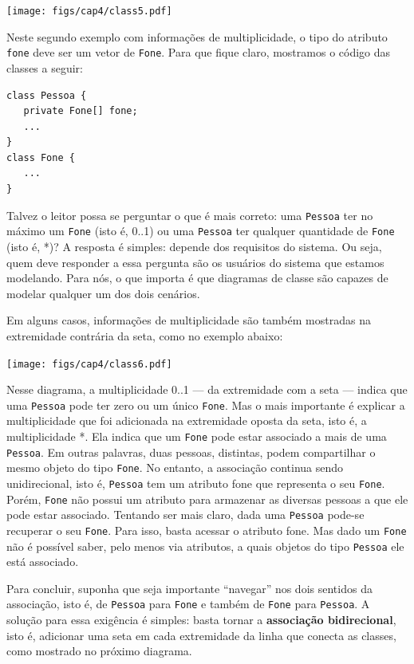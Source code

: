 \documentclass[
  11pt,
  twoside]{book}
\newcommand{\passthrough}[1]{#1}
\begin{document}
\texttt{[image: figs/cap4/class5.pdf]}

Neste segundo exemplo com informações de multiplicidade, o tipo do
atributo \passthrough{\lstinline!fone!} deve ser um vetor de
\passthrough{\lstinline!Fone!}. Para que fique claro, mostramos o código
das classes a seguir:

\begin{lstlisting}
class Pessoa {
   private Fone[] fone;
   ...
}
class Fone {
   ...
}
\end{lstlisting}

Talvez o leitor possa se perguntar o que é mais correto: uma
\passthrough{\lstinline!Pessoa!} ter no máximo um
\passthrough{\lstinline!Fone!} (isto é, 0..1) ou uma
\passthrough{\lstinline!Pessoa!} ter qualquer quantidade de
\passthrough{\lstinline!Fone!} (isto é, *)? A resposta é simples:
depende dos requisitos do sistema. Ou seja, quem deve responder a essa
pergunta são os usuários do sistema que estamos modelando. Para nós, o
que importa é que diagramas de classe são capazes de modelar qualquer um
dos dois cenários.

Em alguns casos, informações de multiplicidade são também mostradas na
extremidade contrária da seta, como no exemplo abaixo:

\texttt{[image: figs/cap4/class6.pdf]}

Nesse diagrama, a multiplicidade 0..1 --- da extremidade com a seta ---
indica que uma \passthrough{\lstinline!Pessoa!} pode ter zero ou um
único \passthrough{\lstinline!Fone!}. Mas o mais importante é explicar a
multiplicidade que foi adicionada na extremidade oposta da seta, isto é,
a multiplicidade *. Ela indica que um \passthrough{\lstinline!Fone!}
pode estar associado a mais de uma \passthrough{\lstinline!Pessoa!}. Em
outras palavras, duas pessoas, distintas, podem compartilhar o mesmo
objeto do tipo \passthrough{\lstinline!Fone!}. No entanto, a associação
continua sendo unidirecional, isto é, \passthrough{\lstinline!Pessoa!}
tem um atributo fone que representa o seu
\passthrough{\lstinline!Fone!}. Porém, \passthrough{\lstinline!Fone!}
não possui um atributo para armazenar as diversas pessoas a que ele pode
estar associado. Tentando ser mais claro, dada uma
\passthrough{\lstinline!Pessoa!} pode-se recuperar o seu
\passthrough{\lstinline!Fone!}. Para isso, basta acessar o atributo
fone. Mas dado um \passthrough{\lstinline!Fone!} não é possível saber,
pelo menos via atributos, a quais objetos do tipo
\passthrough{\lstinline!Pessoa!} ele está associado.

Para concluir, suponha que seja importante ``navegar'' nos dois sentidos
da associação, isto é, de \passthrough{\lstinline!Pessoa!} para
\passthrough{\lstinline!Fone!} e também de
\passthrough{\lstinline!Fone!} para \passthrough{\lstinline!Pessoa!}. A
solução para essa exigência é simples: basta tornar a \textbf{associação
bidirecional}, isto é, adicionar uma seta em cada extremidade da linha
que conecta as classes, como mostrado no próximo diagrama.
\end{document}
